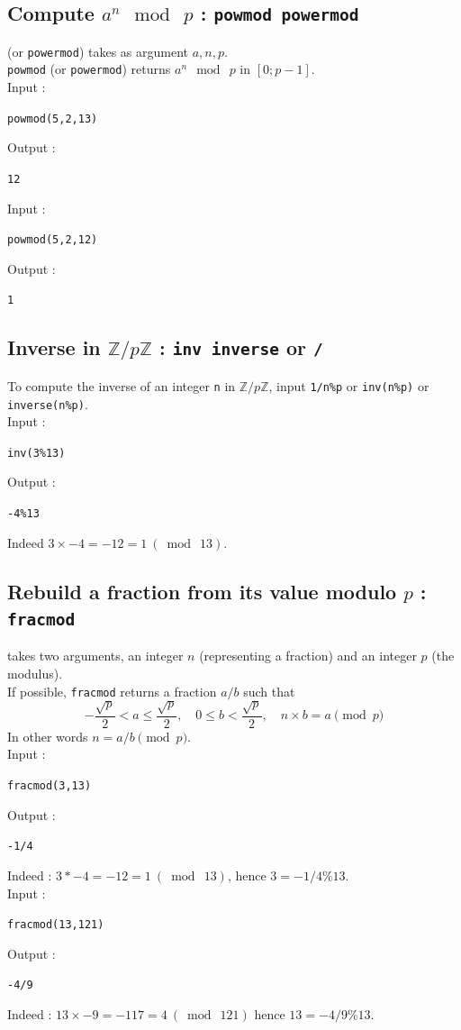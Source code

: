 \documentclass[a4paper,11pt]{book}
\newcommand{\Z}{{\mathbb{Z}}}
\begin{document}
\subsection{Compute $a^n\ \bmod \ p$ : {\tt powmod powermod}}
 (or {\tt powermod}) takes as argument $a,n,p$.\\
{\tt powmod} (or {\tt powermod}) returns $a^n\ \bmod \ p$ in $[0;p-1]$.\\
Input :
\begin{center}{\tt powmod(5,2,13)}\end{center}
Output :
\begin{center}{\tt 12}\end{center}
Input :
\begin{center}{\tt powmod(5,2,12)}\end{center}
Output :
\begin{center}{\tt 1}\end{center}

\subsection{Inverse in $\Z/p\Z$ : {\tt inv inverse} or {\tt /}}\index{/}
To compute the inverse of an integer {\tt n} in $\Z/p\Z$, input {\tt 1/n\%p} 
or {\tt inv(n\%p)} or {\tt inverse(n\%p)}.\\
Input :
\begin{center}{\tt inv(3\%13) }\end{center}
Output :
\begin{center}{\tt -4\%13}\end{center}
Indeed $3\times-4=-12=1\ (\bmod\ 13)$.

\subsection{Rebuild a fraction from its value modulo $p$ : {\tt fracmod}}
 takes two arguments, an integer $n$ 
(representing a fraction) and an integer $p$ (the modulus).\\
If possible, {\tt fracmod} returns a fraction $a/b$ such that 
\[ -\frac{\sqrt{p}}{2} < a \leq \frac{\sqrt{p}}{2}, \quad
 0 \leq b < \frac{\sqrt{p}}{2}, \quad 
 n \times b =a \pmod p \]
In other words $n=a/b\pmod p$.\\
Input :
\begin{center}{\tt fracmod(3,13) }\end{center}
Output :
\begin{center}{\tt -1/4}\end{center}
Indeed : $3*-4=-12=1\ (\bmod\ 13)$, hence $3=-1/4\%13$.\\
Input :
\begin{center}{\tt fracmod(13,121)}\end{center}
Output :
\begin{center}{\tt -4/9}\end{center}
Indeed : $13\times-9=-117=4\ (\bmod\ 121)$ hence $13=-4/9\%13$.
\end{document}
